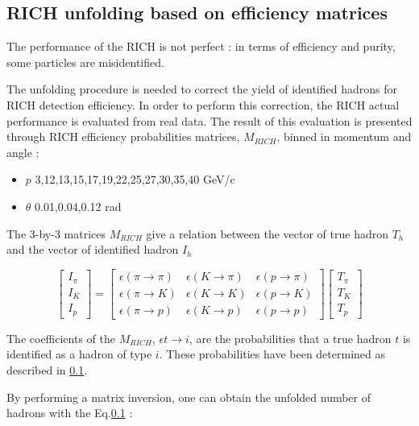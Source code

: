 \documentclass[letterpaper,12pt]{article}
\begin{document}
\subsection{RICH unfolding based on efficiency matrices}

The performance of the RICH is not perfect : in terms of efficiency and purity, some particles
are misidentified.

The unfolding procedure is needed to correct the yield of identified hadrons for RICH detection efficiency.
In order to perform this correction, the RICH actual performance is evaluated from real data. The result of
this evaluation is presented through RICH efficiency probabilities matrices, $M_{RICH}$, binned in momentum
and angle :

\begin{itemize}
  \item $p$ {3,12,13,15,17,19,22,25,27,30,35,40} GeV/c
  \item $\theta$ {0.01,0.04,0.12} rad
\end{itemize}

The 3-by-3 matrices $M_{RICH}$ give a relation between the vector of true hadron $T_h$ and the vector of
identified hadron $I_h$

\begin{equation}
\begin{bmatrix}
I_{\pi} \\
I_K \\
I_p
\end{bmatrix}
=
\begin{bmatrix}
\epsilon(\pi \rightarrow \pi) & \epsilon(K \rightarrow \pi) & \epsilon(p \rightarrow \pi)\\
\epsilon(\pi \rightarrow K) & \epsilon(K \rightarrow K) & \epsilon(p \rightarrow K) \\
\epsilon(\pi \rightarrow p) & \epsilon(K \rightarrow p) & \epsilon(p \rightarrow p)
\end{bmatrix}
\begin{bmatrix}
T_{\pi} \\
T_K \\
T_p
\end{bmatrix}
\end{equation}

The coefficients of the $M_{RICH}$, $\epsilon{t \rightarrow i}$, are the probabilities that a true hadron
$t$ is identified as a hadron of type $i$. These probabilities have been determined as described in \ref{}.

By performing a matrix inversion, one can obtain the unfolded number of hadrons with the Eq.\ref{} :
\end{document}
